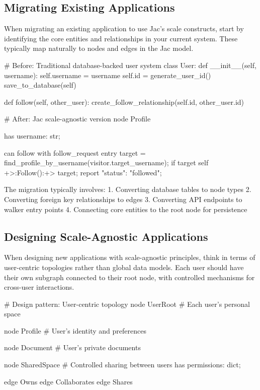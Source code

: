 \subsection{Migrating Existing Applications}

When migrating an existing application to use Jac's scale constructs, start by identifying the core entities and relationships in your current system. These typically map naturally to nodes and edges in the Jac model.

\begin{jacblock}
# Before: Traditional database-backed user system
class User:
    def __init__(self, username):
        self.username = username
        self.id = generate_user_id()
        save_to_database(self)

    def follow(self, other_user):
        create_follow_relationship(self.id, other_user.id)

# After: Jac scale-agnostic version
node Profile {
    has username: str;

    can follow with follow_request entry {
        target = find_profile_by_username(visitor.target_username);
        if target {
            self +>:Follow():+> target;
            report {"status": "followed"};
        }
    }
}
\end{jacblock}

The migration typically involves:
1. Converting database tables to node types
2. Converting foreign key relationships to edges
3. Converting API endpoints to walker entry points
4. Connecting core entities to the root node for persistence

\subsection{Designing Scale-Agnostic Applications}

When designing new applications with scale-agnostic principles, think in terms of user-centric topologies rather than global data models. Each user should have their own subgraph connected to their root node, with controlled mechanisms for cross-user interactions.

\begin{jacblock}
# Design pattern: User-centric topology
node UserRoot {
    # Each user's personal space
}

node Profile {
    # User's identity and preferences
}

node Document {
    # User's private documents
}

node SharedSpace {
    # Controlled sharing between users
    has permissions: dict;
}

edge Owns {}
edge Collaborates {}
edge Shares {}
\end{jacblock}
